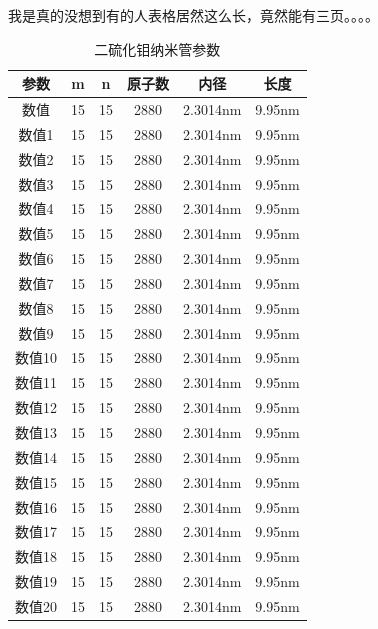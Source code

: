 \documentclass[AutoFakeBold]{LUTThesis}
\begin{document}
我是真的没想到有的人表格居然这么长，竟然能有三页。。。。


\begin{longtable}{cccccc} %
    \caption{二硫化钼纳米管参数}\label{tbl_mos2_nanotube2} \\
    \toprule
    参数   & m  & n  & 原子数  & 内径       & 长度         \\
    \midrule
    数值   & 15 & 15 & 2880 & 2.3014nm & 9.95nm     \\
    数值1  & 15 & 15 & 2880 & 2.3014nm & 9.95nm     \\
    数值2  & 15 & 15 & 2880 & 2.3014nm & 9.95nm     \\
    数值3  & 15 & 15 & 2880 & 2.3014nm & 9.95nm     \\
    数值4  & 15 & 15 & 2880 & 2.3014nm & 9.95nm     \\
    数值5  & 15 & 15 & 2880 & 2.3014nm & 9.95nm     \\
    数值6  & 15 & 15 & 2880 & 2.3014nm & 9.95nm     \\
    数值7  & 15 & 15 & 2880 & 2.3014nm & 9.95nm     \\
    数值8  & 15 & 15 & 2880 & 2.3014nm & 9.95nm     \\
    数值9  & 15 & 15 & 2880 & 2.3014nm & 9.95nm     \\
    数值10 & 15 & 15 & 2880 & 2.3014nm & 9.95nm     \\
    数值11 & 15 & 15 & 2880 & 2.3014nm & 9.95nm     \\
    数值12 & 15 & 15 & 2880 & 2.3014nm & 9.95nm     \\
    数值13 & 15 & 15 & 2880 & 2.3014nm & 9.95nm     \\
    数值14 & 15 & 15 & 2880 & 2.3014nm & 9.95nm     \\
    数值15 & 15 & 15 & 2880 & 2.3014nm & 9.95nm     \\
    数值16 & 15 & 15 & 2880 & 2.3014nm & 9.95nm     \\
    数值17 & 15 & 15 & 2880 & 2.3014nm & 9.95nm     \\
    数值18 & 15 & 15 & 2880 & 2.3014nm & 9.95nm     \\
    数值19 & 15 & 15 & 2880 & 2.3014nm & 9.95nm     \\
    数值20 & 15 & 15 & 2880 & 2.3014nm & 9.95nm     \\
    \bottomrule
\end{longtable}



\end{document}
